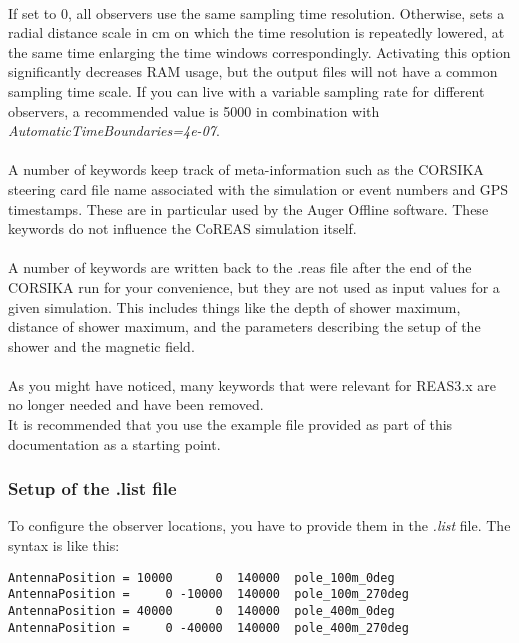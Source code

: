 \documentclass[a4paper,10pt]{article}
\begin{document}
\\
If set to 0, all observers use the same sampling time resolution. Otherwise, sets a radial distance scale in cm on which the time resolution is repeatedly lowered, at the same time enlarging the time windows correspondingly. Activating this option significantly decreases RAM usage, but the output files will not have a common sampling time scale. If you can live with a variable sampling rate for different observers, a recommended value is 5000 in combination with {\it AutomaticTimeBoundaries=4e-07}.\\

\\
A number of keywords keep track of meta-information such as the CORSIKA steering card file name associated with the simulation or event numbers and GPS timestamps. These are in particular used by the Auger Offline software. These keywords do not influence the CoREAS simulation itself.\\

\\
A number of keywords are written back to the .reas file after the end of the CORSIKA run for your convenience, but they are not used as input values for a given simulation. This includes things like the depth of shower maximum, distance of shower maximum, and the parameters describing the setup of the shower and the magnetic field.\\

\\
As you might have noticed, many keywords that were relevant for REAS3.x are no longer needed and have been removed.\\

\noindent It is recommended that you use the example file provided as part of this documentation as a starting point.

\subsubsection{Setup of the .list file}

To configure the observer locations, you have to provide them in the {\it .list} file. The syntax is like this:

\begin{verbatim}
AntennaPosition = 10000      0  140000  pole_100m_0deg
AntennaPosition =     0 -10000  140000  pole_100m_270deg
AntennaPosition = 40000      0  140000  pole_400m_0deg
AntennaPosition =     0 -40000  140000  pole_400m_270deg
\end{verbatim}
\end{document}
